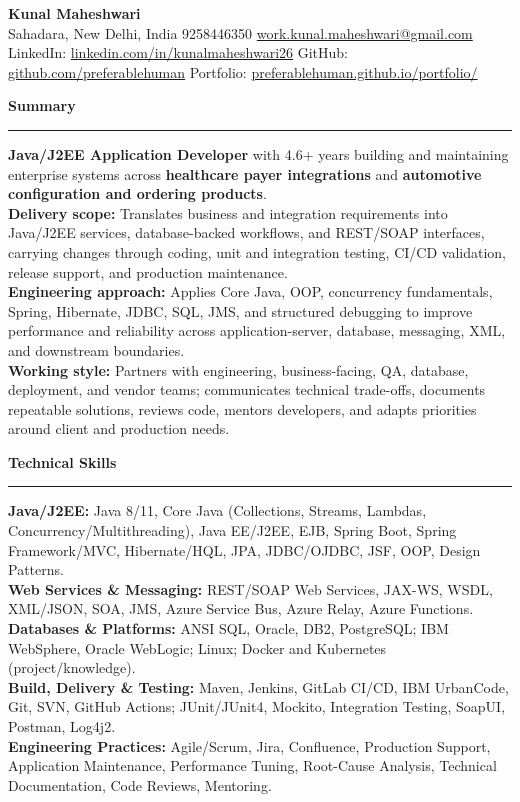\documentclass[11pt,letterpaper]{article}
\newcommand{\ressection}[1]{\Needspace{6\baselineskip}\vspace{8pt}\par\textbf{#1}\par\vspace{2pt}\hrule\vspace{5pt}}
\begin{document}
\pagestyle{empty}\raggedright\fontsize{11}{12.5}\selectfont

{\Large \textbf{Kunal Maheshwari}}\\
Sahadara, New Delhi, India \textbar{} 9258446350 \textbar{} \href{mailto:work.kunal.maheshwari@gmail.com}{work.kunal.maheshwari@gmail.com}\\
LinkedIn: \href{https://www.linkedin.com/in/kunalmaheshwari26}{linkedin.com/in/kunalmaheshwari26} \textbar{} GitHub: \href{https://github.com/preferablehuman}{github.com/preferablehuman} \textbar{} Portfolio: \href{https://preferablehuman.github.io/portfolio/}{preferablehuman.github.io/portfolio/}

\ressection{Summary}
\textbf{Java/J2EE Application Developer} with 4.6+ years building and maintaining enterprise systems across \textbf{healthcare payer integrations} and \textbf{automotive configuration and ordering products}.\\[2pt]
\textbf{Delivery scope:} Translates business and integration requirements into Java/J2EE services, database-backed workflows, and REST/SOAP interfaces, carrying changes through coding, unit and integration testing, CI/CD validation, release support, and production maintenance.\\[2pt]
\textbf{Engineering approach:} Applies Core Java, OOP, concurrency fundamentals, Spring, Hibernate, JDBC, SQL, JMS, and structured debugging to improve performance and reliability across application-server, database, messaging, XML, and downstream boundaries.\\[2pt]
\textbf{Working style:} Partners with engineering, business-facing, QA, database, deployment, and vendor teams; communicates technical trade-offs, documents repeatable solutions, reviews code, mentors developers, and adapts priorities around client and production needs.

\ressection{Technical Skills}
\textbf{Java/J2EE:} Java 8/11, Core Java (Collections, Streams, Lambdas, Concurrency/Multithreading), Java EE/J2EE, EJB, Spring Boot, Spring Framework/MVC, Hibernate/HQL, JPA, JDBC/OJDBC, JSF, OOP, Design Patterns.\\
\textbf{Web Services \& Messaging:} REST/SOAP Web Services, JAX-WS, WSDL, XML/JSON, SOA, JMS, Azure Service Bus, Azure Relay, Azure Functions.\\
\textbf{Databases \& Platforms:} ANSI SQL, Oracle, DB2, PostgreSQL; IBM WebSphere, Oracle WebLogic; Linux; Docker and Kubernetes (project/knowledge).\\
\textbf{Build, Delivery \& Testing:} Maven, Jenkins, GitLab CI/CD, IBM UrbanCode, Git, SVN, GitHub Actions; JUnit/JUnit4, Mockito, Integration Testing, SoapUI, Postman, Log4j2.\\
\textbf{Engineering Practices:} Agile/Scrum, Jira, Confluence, Production Support, Application Maintenance, Performance Tuning, Root-Cause Analysis, Technical Documentation, Code Reviews, Mentoring.
\end{document}
